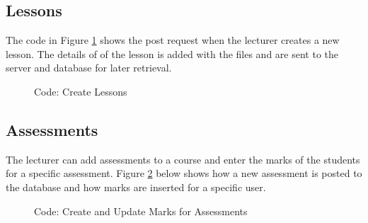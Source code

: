 \documentclass[a4paper,12pt]{article}
\numberwithin{equation}{section} %
\numberwithin{figure}{section}
\begin{document}
\subsection{Lessons}
The code in Figure \ref{cLessons} shows the post request when the lecturer creates a new lesson. The details of of the lesson is added with the files and are sent to the server and database for later retrieval.

\begin{figure}[H]
\centering
{}
\caption{Code: Create Lessons}
\label{cLessons}
\end{figure}


\subsection{Assessments}
The lecturer can add assessments to a course and enter the marks of the students for a specific assessment. Figure \ref{cAses} below shows how a new assessment is posted to the database and how marks are inserted for a specific user.

\begin{figure}[H]
\centering
{}
\caption{Code: Create and Update Marks for Assessments}
\label{cAses}
\end{figure}
\end{document}
